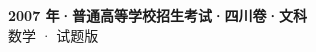\documentclass[zihao=-4, a4paper]{ctexart}
\begin{document}
\begin{center}
  {\Large\bfseries 2007 年·普通高等学校招生考试·四川卷·文科}\\[4pt]
  {\large 数学 · 试题版}
\end{center}
\medskip
{}

\end{document}
